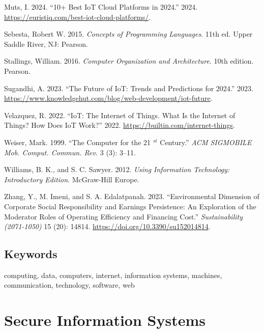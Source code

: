 \documentclass[
  letterpaper,
  DIV=11,
  numbers=noendperiod]{scrreprt}
\newlength{\cslhangindent}
\newenvironment{CSLReferences}[2] %
 {\begin{list}{}{%
  \setlength{\itemindent}{0pt}
  \setlength{\leftmargin}{0pt}
  \setlength{\parsep}{0pt}
  \ifodd #1
   \setlength{\leftmargin}{\cslhangindent}
   \setlength{\itemindent}{-1\cslhangindent}
  \fi
  \setlength{\itemsep}{#2\baselineskip}}}
 {\end{list}}
\begin{document}
\begin{CSLReferences}{1}{0}
Muts, I. 2024. {``10+ Best IoT Cloud Platforms in 2024.''} 2024.
\url{https://euristiq.com/best-iot-cloud-platforms/}.

Sebesta, Robert W. 2015. \emph{Concepts of Programming Languages}. 11th
ed. Upper Saddle River, NJ: Pearson.

Stallings, William. 2016. \emph{Computer Organization and Architecture}.
10th edition. Pearson.

Sugandhi, A. 2023. {``The Future of IoT: Trends and Predictions for
2024.''} 2023.
\url{https://www.knowledgehut.com/blog/web-development/iot-future}.

Velazquez, R. 2022. {``IoT: The Internet of Things. What Is the Internet
of Things? How Does IoT Work?''} 2022.
\url{https://builtin.com/internet-things}.

Weiser, Mark. 1999. {``The Computer for the 21 \(^{st}\) Century.''}
\emph{ACM SIGMOBILE Mob. Comput. Commun. Rev.} 3 (3): 3--11.

Williams, B. K., and S. C. Sawyer. 2012. \emph{Using Information
Technology: Introductory Edition}. McGraw-Hill Europe.

Zhang, Y., M. Imeni, and S. A. Edalatpanah. 2023. {``Environmental
Dimension of Corporate Social Responsibility and Earnings Persistence:
An Exploration of the Moderator Roles of Operating Efficiency and
Financing Cost.''} \emph{Sustainability (2071-1050)} 15 (20): 14814.
\url{https://doi.org/10.3390/su152014814}.

\end{CSLReferences}

\section{Keywords}\label{keywords}

computing, data, computers, internet, information systems, machines,
communication, technology, software, web


\chapter{Secure Information Systems}\label{secure-information-systems}
\end{document}
